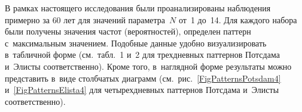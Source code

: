 \begin{multicols}{2}
В рамках настоящего исследования были проанализированы наблюдения
примерно за $60$ лет для значений параметра~$N$ от~1 до~14. Для каждого
набора были получены значения частот (вероятностей), определен паттерн 
с~максимальным значением. Подобные данные удобно визуализировать 
в~табличной форме (см.\ табл.~1 и~2 для трехдневных
паттернов Потсдама и~Элис\-ты соответственно). Кроме того, в~наглядной форме
результаты можно представить в~виде столбчатых диаграмм (см.\
рис.~\ref{FigPatternsPotsdam4} и~\ref{FigPatternsElista4} для четырехдневных
паттернов Потсдама и~Элис\-ты соответственно).

\begin{figure*} %
\vspace*{1pt}
 \begin{center}
 \mbox{%
 \epsfxsize=120.754mm 
 }
\end{center}
\vspace*{-11pt}
\end{figure*}

\setcounter{table}{2}

\begin{table*}[b]\small %
\vspace*{-6pt}
\begin{center}
\label{TabProbPotsdam}
\vspace*{2ex}


\end{center}
\end{table*}
\end{multicols}
